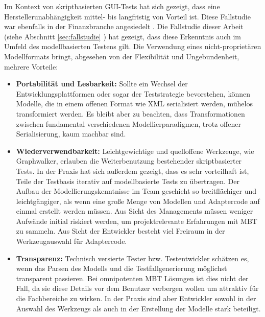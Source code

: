 Im Kontext von skriptbasierten GUI-Tests hat sich gezeigt, dass eine Herstellerunabhängigkeit mittel- bis langfristig von Vorteil ist. Diese Fallstudie war ebenfalls in der Finanzbranche angesiedelt \cite{graham_experiences_2012}. Die Fallstudie dieser Arbeit (siehe Abschnitt \ref{sec:fallstudie} ) hat gezeigt, dass diese Erkenntnis auch im Umfeld des modellbasierten Testens gilt. Die Verwendung eines nicht-proprietären Modellformats bringt, abgesehen von der Flexibilität und Ungebundenheit, mehrere Vorteile:

\begin{itemize}
\item \textbf{Portabilität und Lesbarkeit:} Sollte ein Wechsel der Entwicklungsplattformen oder sogar der Teststrategie bevorstehen, können Modelle, die in einem offenen Format wie XML serialisiert werden, mühelos transformiert werden. Es bleibt aber zu beachten, dass Transformationen zwischen fundamental verschiedenen Modellierparadigmen, trotz offener Serialisierung, kaum machbar sind.
\item \textbf{Wiederverwendbarkeit:} Leichtgewichtige und quelloffene Werkzeuge, wie Graphwalker, erlauben die Weiterbenutzung bestehender skriptbasierter Tests. In der Praxis hat sich außerdem gezeigt, dass es sehr vorteilhaft ist, Teile der Testbasis iterativ auf modellbasierte Tests zu übertragen. Der Aufbau der Modellierungskenntnisse im Team geschieht so breitflächiger und leichtgängiger, als wenn eine große Menge von Modellen und Adaptercode auf einmal erstellt werden müssen. Aus Sicht des Managements müssen weniger Aufwände initial riskiert werden, um projektrelevante Erfahrungen mit \Gls{MBT} zu sammeln. Aus Sicht der Entwickler besteht viel Freiraum in der Werkzeugauswahl für Adaptercode.
\item \textbf{Transparenz:} Technisch versierte Tester bzw. Testentwickler schätzen es, wenn das Parsen des Modells und die Testfallgenerierung möglichst transparent passieren. Bei omnipotenten \Gls{MBT} Lösungen ist dies nicht der Fall, da sie diese Details vor dem Benutzer verbergen wollen um attraktiv für die Fachbereiche zu wirken. In der Praxis sind aber Entwickler sowohl in der Auswahl des Werkzeugs als auch in der Erstellung der Modelle stark beteiligt.
\end{itemize}

